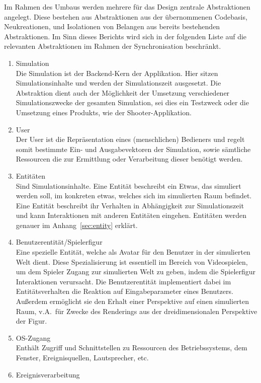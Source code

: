 \documentclass[11pt,twoside,a4paper]{article}
\begin{document}
Im Rahmen des Umbaus werden mehrere für das Design zentrale Abstraktionen angelegt.
Diese bestehen aus Abstraktionen aus der übernommenen Codebasis, Neukreationen, und Isolationen von Belangen aus bereits bestehenden Abstraktionen. Im Sinn dieses Berichts wird sich in der folgenden Liste auf die relevanten Abstraktionen im Rahmen der Synchronisation beschränkt.

\begin{enumerate}
\item Simulation\\
Die Simulation ist der Backend-Kern der Applikation. Hier sitzen Simulationsinhalte und werden der Simulationszeit ausgesetzt. Die Abstraktion dient auch der Möglichkeit der Umsetzung verschiedener Simulationszwecke der gesamten Simulation, sei dies ein Testzweck oder die Umsetzung eines Produkts, wie der Shooter-Applikation.
\item User\\
Der User ist die Repräsentation eines (menschlichen) Bedieners und regelt somit bestimmte Ein- und Ausgabevektoren der Simulation, sowie sämtliche Ressourcen die zur Ermittlung oder Verarbeitung dieser benötigt werden.
\item Entitäten\\
Sind Simulationsinhalte. Eine Entität beschreibt ein \glqq Etwas\grqq, das simuliert werden soll, im konkreten etwas, welches sich im simulierten Raum befindet. Eine Entität beschreibt ihr Verhalten in Abhängigkeit zur Simulationszeit und kann Interaktionen mit anderen Entitäten eingehen. Entitäten werden genauer im Anhang~\ref{sec:entity} erklärt.
\item Benutzerentität/Spielerfigur\\
Eine spezielle Entität, welche als Avatar für den Benutzer in der simulierten Welt dient. Diese Spezialisierung ist essentiell im Bereich von Videospielen, um dem Spieler Zugang zur simulierten Welt zu geben, indem die Spielerfigur Interaktionen verursacht. Die Benutzerentität implementiert dabei im Entitätsverhalten die Reaktion auf Eingabeparameter eines Benutzers. Außerdem ermöglicht sie den Erhalt einer Perspektive auf einen simulierten Raum, v.A.~für Zwecke des Renderings aus der dreidimensionalen Perspektive der Figur.
\item OS-Zugang\\
Enthält Zugriff und Schnittstellen zu Ressourcen des Betriebssystems, dem Fenster, Ereignisquellen, Lautsprecher, etc.
\item Ereignisverarbeitung\\

\end{enumerate}
\end{document}
